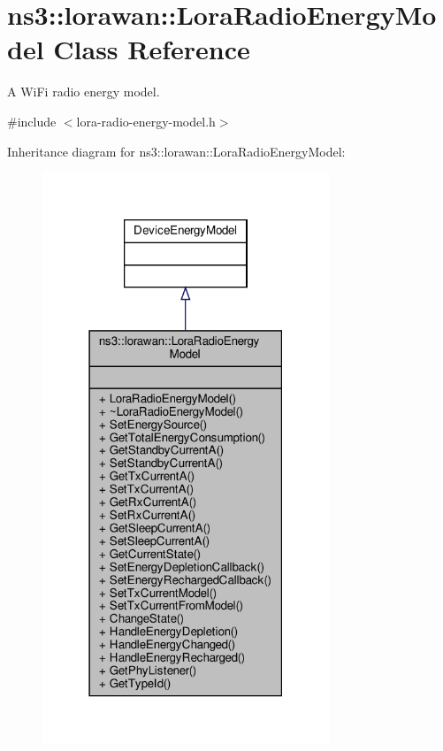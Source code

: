 \hypertarget{classns3_1_1lorawan_1_1LoraRadioEnergyModel}{}\section{ns3\+:\+:lorawan\+:\+:Lora\+Radio\+Energy\+Model Class Reference}
\label{classns3_1_1lorawan_1_1LoraRadioEnergyModel}


A Wi\+Fi radio energy model.  




{\ttfamily \#include $<$lora-\/radio-\/energy-\/model.\+h$>$}



Inheritance diagram for ns3\+:\+:lorawan\+:\+:Lora\+Radio\+Energy\+Model\+:
\nopagebreak
\begin{figure}[H]
\begin{center}
\leavevmode
\includegraphics[width=243pt]{classns3_1_1lorawan_1_1LoraRadioEnergyModel__inherit__graph}
\end{center}
\end{figure}


